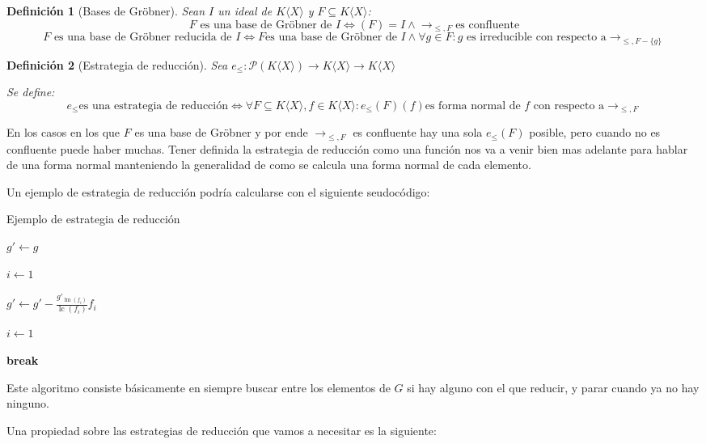\documentclass[fleqn]{amsbook} %
\theoremstyle{customstyle}
\newtheorem{definition}{Definición}[section]
\DeclareMathOperator{\sop}{sop}
\DeclareMathOperator{\lm}{lm}
\DeclareMathOperator{\lc}{lc}
\begin{document}
\begin{definition}[Bases de Gröbner]
Sean $I$ un ideal de $K⟨X⟩$ y $F ⊆ K⟨X⟩$:
\[ F\text{ es una base de Gröbner de }I ⇔ (F) = I ∧ →_{≤, F} \text{es confluente} \]
\[ F\text{ es una base de Gröbner reducida de }I ⇔ %
F \text{es una base de Gröbner de }I ∧ ∀g ∈ F : g\text{ es irreducible con respecto a} →_{≤, F - \{g\}} \]
\end{definition}

\begin{definition}[Estrategia de reducción]
Sea $e_≤ : 𝒫(K⟨X⟩) → K⟨X⟩ → K⟨X⟩$

Se define:
\[ e_≤ \text{es una estrategia de reducción} ⇔ %
∀F ⊆ K⟨X⟩, f ∈ K⟨X⟩ : e_≤(F)(f) \text{es forma normal de $f$ con respecto a} →_{≤, F} \]
\end{definition}

En los casos en los que $F$ es una base de Gröbner y por ende $→_{≤, F}$ es confluente hay una sola $e_≤(F)$ posible, pero cuando no es confluente puede haber muchas. Tener definida la estrategia de reducción como una función nos va a venir bien mas adelante para hablar de una forma normal manteniendo la generalidad de como se calcula una forma normal de cada elemento.

Un ejemplo de estrategia de reducción podría calcularse con el siguiente seudocódigo:

\begin{algorithm}[H] %
  \caption{Ejemplo de estrategia de reducción}\label{alg:estrategia de reducción}
  $g' ← g$

  $i ← 1$

   {
     {
      \If{$f_i ∈ \sop(g')$} {
        $g' ← g' - \frac{g'_{\lm(f_i)}}{\lc(f_i)}f_i$

        $i ← 1$

        \textbf{break}
      }
    }
  }
\end{algorithm}

Este algoritmo consiste básicamente en siempre buscar entre los elementos de $G$ si hay alguno con el que reducir, y parar cuando ya no hay ninguno.

Una propiedad sobre las estrategias de reducción que vamos a necesitar es la siguiente:
\end{document}
